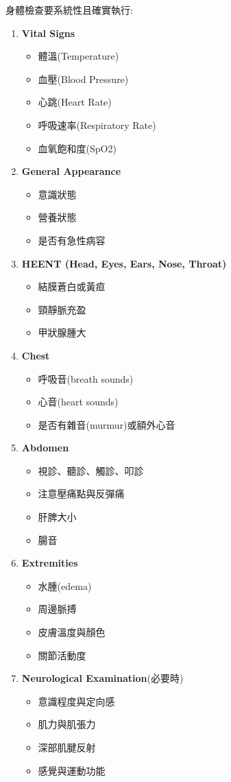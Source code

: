\documentclass[12pt,a4paper]{article}
\begin{document}
身體檢查要系統性且確實執行:

\begin{enumerate}[leftmargin=*]
\item \textbf{Vital Signs}
\begin{itemize}
\item 體溫(Temperature)
\item 血壓(Blood Pressure)
\item 心跳(Heart Rate)
\item 呼吸速率(Respiratory Rate)
\item 血氧飽和度(SpO2)
\end{itemize}

\item \textbf{General Appearance}
\begin{itemize}
\item 意識狀態
\item 營養狀態
\item 是否有急性病容
\end{itemize}

\item \textbf{HEENT (Head, Eyes, Ears, Nose, Throat)}
\begin{itemize}
\item 結膜蒼白或黃疸
\item 頸靜脈充盈
\item 甲狀腺腫大
\end{itemize}

\item \textbf{Chest}
\begin{itemize}
\item 呼吸音(breath sounds)
\item 心音(heart sounds)
\item 是否有雜音(murmur)或額外心音
\end{itemize}

\item \textbf{Abdomen}
\begin{itemize}
\item 視診、聽診、觸診、叩診
\item 注意壓痛點與反彈痛
\item 肝脾大小
\item 腸音
\end{itemize}

\item \textbf{Extremities}
\begin{itemize}
\item 水腫(edema)
\item 周邊脈搏
\item 皮膚溫度與顏色
\item 關節活動度
\end{itemize}

\item \textbf{Neurological Examination}(必要時)
\begin{itemize}
\item 意識程度與定向感
\item 肌力與肌張力
\item 深部肌腱反射
\item 感覺與運動功能
\end{itemize}
\end{enumerate}
\end{document}
